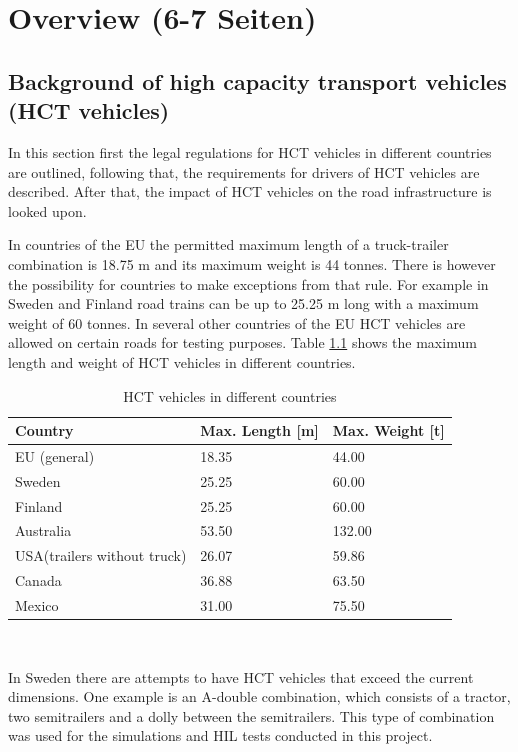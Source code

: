 \documentclass[ExampleMasters.tex]{subfiles}
\begin{document}
\clearpage
{\pagestyle{empty}\cleardoublepage}%
\chapter{Overview (6-7 Seiten)}
\label{chap:overview}


\section{Background of high capacity transport vehicles (HCT vehicles)}
\label{sec:legal_situation}
In this section first the legal regulations for \gls{HCT} vehicles in different countries are outlined, following that, the requirements for drivers of \gls{HCT} vehicles are described. After that, the impact of \gls{HCT} vehicles on the road infrastructure is looked upon.

In countries of the EU the permitted maximum length of a truck-trailer combination is 18.75 m and its maximum weight is 44 tonnes. There is however the possibility for countries to make exceptions from that rule.\cite{96/53/EC}  For example in Sweden and Finland road trains can be up to 25.25 m long with a  maximum weight of 60 tonnes.\cite{Vaegverket}
In several other countries of the EU \gls{HCT} vehicles are allowed on certain roads for testing purposes. 
Table \ref{tab:HCT_vehicles_in_different_countries} shows the maximum length and weight of \gls{HCT} vehicles in different countries.

\begin{table}[!htb]
	\centering
	\caption{\gls{HCT} vehicles in different countries\cite{Vaegverket}\cite{HCT_vehicles_Australia}\Cite{HCT_vehicles_USA}\cite{HCT_vehicles_Canada}\Cite{HCT_vehicles_Mexico}}
	\label{tab:HCT_vehicles_in_different_countries}
	\begin{tabular}{l|l|l|}
		Country   & Max. Length [m] & Max. Weight [t] \\ \hline
		EU (general) & 18.35 & 44.00\\
		Sweden    &       25.25      &       60.00      \\
		Finland   &            25.25 &         60.00    \\
		Australia &      53.50       &           132.00  \\
		USA(trailers without truck)&      26.07       &    59.86        \\
		Canada & 36.88 & 63.50 \\
		Mexico & 31.00 & 75.50 \\
	\end{tabular} \\
\end{table}
In Sweden there are attempts to have \gls{HCT} vehicles that exceed the current dimensions. One example is an A-double combination, which consists of a tractor, two semitrailers and a dolly between the semitrailers. This type of combination was used for the simulations and \gls{HIL} tests conducted in this project.\\
\end{document}
